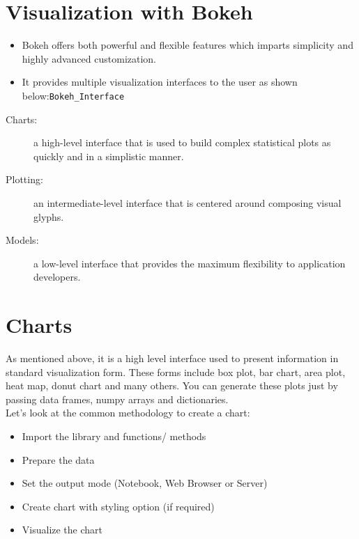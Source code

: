 \documentclass[a4paper,12pt]{article}
\begin{document}
	\Large

 

\section*{Visualization with Bokeh}
\begin{itemize}
\item Bokeh offers both powerful and flexible features which imparts simplicity and highly advanced customization. 



\item It provides multiple visualization interfaces to the user as shown below:\texttt{Bokeh\_Interface}
\end{itemize}


\bigskip
\begin{description}
\item[Charts:] a high-level interface that is used to build complex statistical plots as quickly and in a simplistic manner.
\item[Plotting:] an intermediate-level interface that is centered around composing visual glyphs.
\item[Models:] a low-level interface that provides the maximum flexibility to application developers.
\end{description}
%


\newpage

\section*{Charts}

As mentioned above, it is a high level interface used to present information in standard visualization form. 
These forms include box plot, bar chart, area plot, heat map, donut chart and many others. You can generate these plots just by passing data frames, numpy arrays and dictionaries.\\
\bigskip
Let’s look at the common methodology to create a chart:

\begin{itemize}
\item Import the library and functions/ methods
\item Prepare the data
\item Set the output mode (Notebook, Web Browser or Server)
\item Create chart with styling option (if required)
\item Visualize the chart
\end{itemize}
\end{document}
